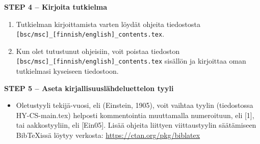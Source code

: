 {\textbf{STEP 4 -- Kirjoita tutkielma}}

\begin{enumerate}
\item Tutkielman kirjoittamista varten löydät ohjeita tiedostosta \newline \texttt{[bsc/msc]\_[finnish/english]\_contents.tex}.
\item Kun olet tutustunut ohjeisiin, voit poistaa tiedoston \newline \texttt{[bsc/msc]\_[finnish/english]\_contents.tex} sisällön ja kirjoittaa oman tutkielmasi kyseiseen tiedostoon.
\end{enumerate}

{\textbf{STEP 5 -- Aseta kirjallisuuslähdeluettelon tyyli}}

\begin{itemize}
\item Oletustyyli tekijä-vuosi, eli (Einstein, 1905), voit vaihtaa tyylin (tiedostossa HY-CS-main.tex) helposti kommentointia muuttamalla numeroituun, eli [1], tai aakkostyyliin, eli [Ein05].
Lisää ohjeita liittyen viittaustyylin säätämiseen {Bib}\TeX issä löytyy verkosta: \url{https://ctan.org/pkg/biblatex}

\end{itemize}
